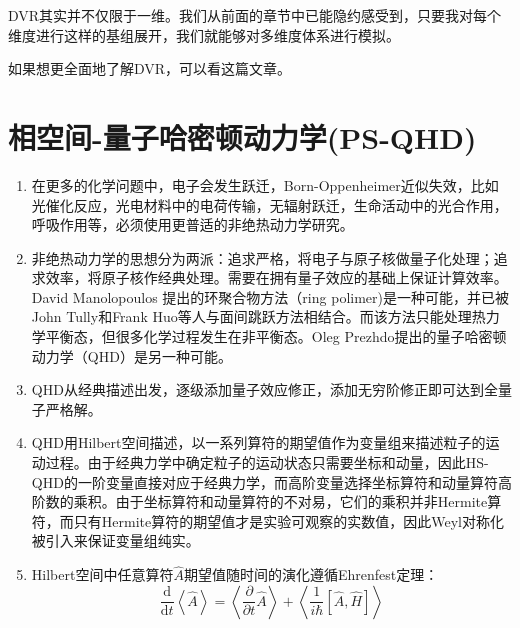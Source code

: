 \documentclass[12pt,a4paper,openany,twoside]{book}
\numberwithin{equation}{section}
\newcommand{\mean}[1]{\left\langle #1 \right\rangle}
\newcommand{\ud}{\mathrm{d}}
\begin{document}
      DVR其实并不仅限于一维。我们从前面的章节中已能隐约感受到，只要我对每个维度进行这样的基组展开，我们就能够对多维度体系进行模拟。

      如果想更全面地了解DVR，可以看这篇文章\cite{colbert1992novel}。

    \chapter{相空间-量子哈密顿动力学(PS-QHD)}
      \label{phase_space_dynamics}
      \begin{enumerate}
        \item 在更多的化学问题中，电子会发生跃迁，Born-Oppenheimer近似失效，比如光催化反应，光电材料中的电荷传输，无辐射跃迁，生命活动中的光合作用，呼吸作用等，必须使用更普适的非绝热动力学研究。

        \item 非绝热动力学的思想分为两派：追求严格，将电子与原子核做量子化处理；追求效率，将原子核作经典处理。需要在拥有量子效应的基础上保证计算效率。David Manolopoulos 提出的环聚合物方法（ring polimer)是一种可能，并已被John Tully和Frank Huo等人与面间跳跃方法相结合。而该方法只能处理热力学平衡态，但很多化学过程发生在非平衡态。Oleg Prezhdo提出的量子哈密顿动力学（QHD）是另一种可能。

        \item QHD从经典描述出发，逐级添加量子效应修正，添加无穷阶修正即可达到全量子严格解。

        \item QHD用Hilbert空间描述，以一系列算符的期望值作为变量组来描述粒子的运动过程。由于经典力学中确定粒子的运动状态只需要坐标和动量，因此HS-QHD的一阶变量直接对应于经典力学，而高阶变量选择坐标算符和动量算符高阶数的乘积。由于坐标算符和动量算符的不对易，它们的乘积并非Hermite算符，而只有Hermite算符的期望值才是实验可观察的实数值，因此Weyl对称化被引入来保证变量组纯实。

        \item Hilbert空间中任意算符$\hat{A}$期望值随时间的演化遵循Ehrenfest定理：
          \begin{equation}
            \frac{\ud}{\ud t}\mean{\hat{A}}=\mean{\frac{\partial}{\partial t} \hat{A}}+\mean{\frac{1}{i\hbar}\left[\hat{A},\hat{H}\right]}
          \end{equation}


\end{enumerate}
\end{document}

